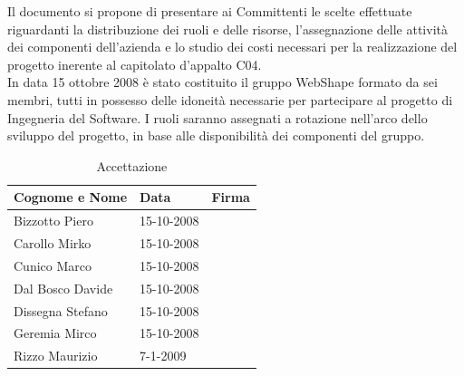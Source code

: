 \newpage
\thispagestyle{fancy}
\tableofcontents
\thispagestyle{fancy}
\newpage


Il documento si propone di presentare ai Committenti le scelte effettuate riguardanti la distribuzione dei ruoli e delle risorse, l'assegnazione delle attivit\`a dei componenti dell'azienda e lo studio dei costi necessari per la realizzazione del progetto inerente al capitolato d'appalto C04.\\

In data 15 ottobre 2008 \`e stato costituito il gruppo WebShape formato da sei membri, tutti in possesso delle idoneit\`a necessarie per partecipare al progetto di Ingegneria del Software.
I ruoli saranno assegnati a rotazione nell'arco dello sviluppo del progetto, in base alle disponibilit\`a dei componenti del gruppo.\\

\begin{table}[h]
	\begin{center}
		  \begin{tabular}{|p{}|l|p{}|}
		 \hline 
		 \textbf{Cognome e Nome} & \textbf{Data} & \textbf{Firma}\\
		 \hline
		Bizzotto Piero & 15-10-2008 & \\
		\hline
		Carollo Mirko & 15-10-2008 & \\
		\hline
		Cunico Marco & 15-10-2008 & \\
		\hline
		Dal Bosco Davide & 15-10-2008 & \\
		\hline
		Dissegna Stefano & 15-10-2008 & \\
		\hline
		Geremia Mirco & 15-10-2008 & \\
		\hline
		Rizzo Maurizio & 7-1-2009 & \\
		\hline
		\end{tabular}
	\caption{Accettazione} 
	\label{tabella_accettazione}
	\end{center}	
\end{table}

\newpage


